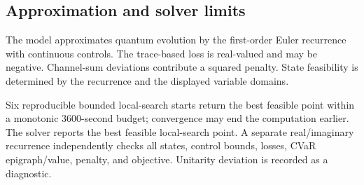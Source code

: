 \documentclass[11pt]{article}
\begin{document}
\subsection*{Approximation and solver limits}
The model approximates quantum evolution by the first-order Euler recurrence with continuous controls. The trace-based loss is real-valued and may be negative. Channel-sum deviations contribute a squared penalty. State feasibility is determined by the recurrence and the displayed variable domains.

Six reproducible bounded local-search starts return the best feasible point
within a monotonic 3600-second budget; convergence may end the computation
earlier. The solver reports the best feasible local-search point. A separate
real/imaginary recurrence independently checks all states, control bounds,
losses, CVaR epigraph/value, penalty, and objective. Unitarity deviation is recorded as a diagnostic.
\end{document}
